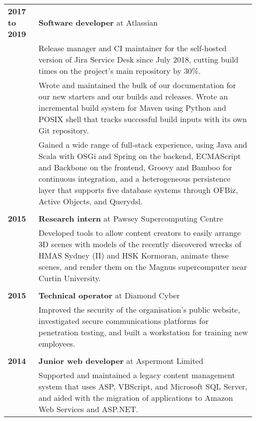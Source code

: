 \documentclass[a4paper,12pt]{article}
\begin{document}
\begin{tabular}{p{35mm}p{125mm}}
	                    \textbf{2017 to 2019}       & \textbf{Software developer} at Atlassian
	\vspace{0.2em}  \\                              & Release manager and CI maintainer for the self-hosted version of Jira Service Desk since July 2018, cutting build times on the project’s main repository by 30\%.
	\vspace{0.2em}  \\                              & Wrote and maintained the bulk of our documentation for our new starters and our builds and releases. Wrote an incremental build system for Maven using Python and POSIX shell that tracks successful build inputs with its own Git repository.
	\vspace{0.2em}  \\                              & Gained a wide range of full-stack experience, using Java and Scala with OSGi and Spring on the backend, ECMAScript and Backbone on the frontend, Groovy and Bamboo for continuous integration, and a heterogeneous persistence layer that supports five database systems through OFBiz, Active Objects, and Querydsl.
	\\              \\  \textbf{2015}               & \textbf{Research intern} at Pawsey Supercomputing Centre
	\vspace{0.2em}  \\                              & Developed tools to allow content creators to easily arrange 3D scenes with models of the recently discovered wrecks of HMAS Sydney (II) and HSK Kormoran, animate these scenes, and render them on the Magnus supercomputer near Curtin University.
	\\              \\  \textbf{2015}               & \textbf{Technical operator} at Diamond Cyber
	\vspace{0.2em}  \\                              & Improved the security of the organisation's public website, investigated secure communications platforms for penetration testing, and built a workstation for training new employees.
	\\              \\  \textbf{2014}               & \textbf{Junior web developer} at Aspermont Limited
	\vspace{0.2em}  \\                              & Supported and maintained a legacy content management system that uses ASP, VBScript, and Microsoft SQL Server, and aided with the migration of applications to Amazon Web Services and ASP.NET.

\end{tabular}
\end{document}
